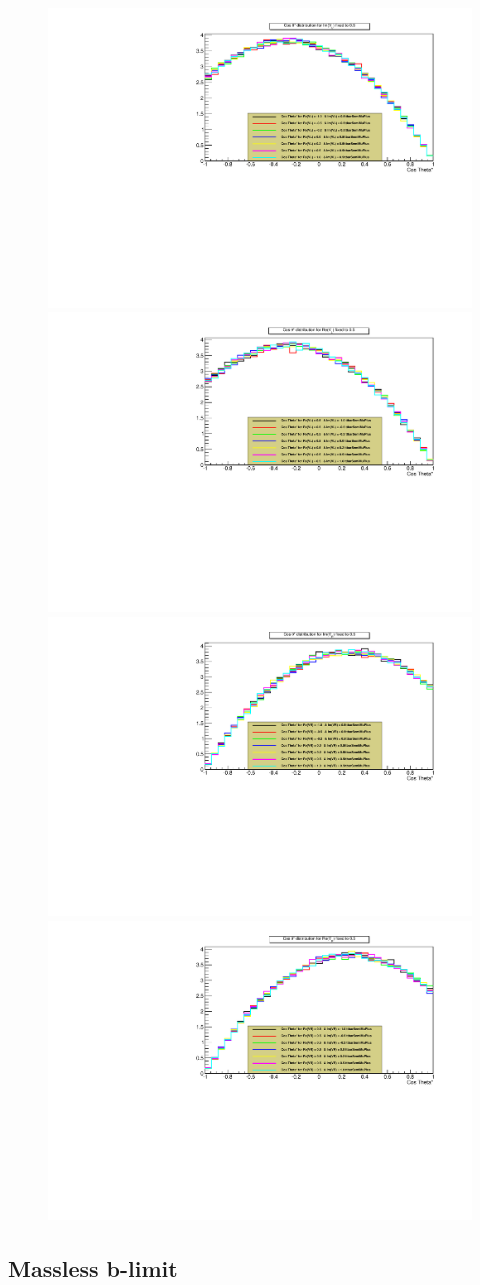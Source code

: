 \begin{figure}[h!]
 \centering
 \includegraphics[width = 0.45 \textwidth]{Afbeeldingen/Chapter_LinkWithTopWidth/CosThetaResults/RVLvsIVL/RVLIVL_CosTheta_IVLFixedTo05.pdf}
 \includegraphics[width = 0.45 \textwidth]{Afbeeldingen/Chapter_LinkWithTopWidth/CosThetaResults/RVLvsIVL/RVLIVL_CosTheta_RVLFixedTo05.pdf}\\
 \includegraphics[width = 0.45 \textwidth]{Afbeeldingen/Chapter_LinkWithTopWidth/CosThetaResults/RVRvsIVR/RVRIVR_CosTheta_IVRFixedTo05.pdf}
 \includegraphics[width = 0.45 \textwidth]{Afbeeldingen/Chapter_LinkWithTopWidth/CosThetaResults/RVRvsIVR/RVRIVR_CosTheta_RVRFixedTo05.pdf}
 \caption{}
 \label{fig::CosThetaOneFullCoupling}
\end{figure}

\subsection{Massless b-limit}

